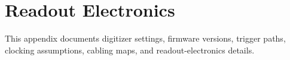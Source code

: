 \section{Readout Electronics}

This appendix documents digitizer settings, firmware versions, trigger paths,
clocking assumptions, cabling maps, and readout-electronics details.

